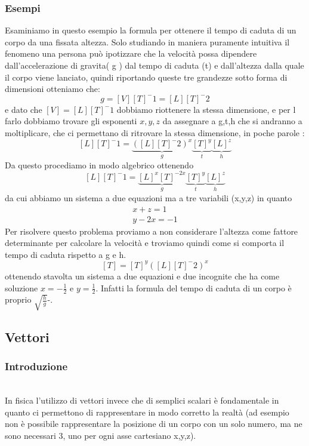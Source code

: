 \documentclass[fontsize = 20px, paper = a4]{article}
\begin{document}
\subsubsection{Esempi}
Esaminiamo in questo esempio la formula per ottenere il tempo di caduta di un corpo da una fissata altezza.
Solo studiando in maniera puramente intuitiva il fenomeno una persona può ipotizzare che la velocità possa dipendere dall'accelerazione di gravita( g ) dal tempo di caduta (t) e dall'altezza dalla quale il corpo viene lanciato, quindi riportando queste tre grandezze sotto forma di dimensioni otteniamo che:
$$g = [V][T]^-1 = [L][T]^-2$$
e dato che $[V] = [L][T]^-1$ dobbiamo riottenere la stessa dimensione, e per l farlo dobbiamo trovare gli esponenti $x,y,z$ da assegnare a g,t,h che si andranno a moltiplicare, che ci permettano di ritrovare la stessa dimensione, in poche parole :
$$[L][T]^-1 = \underbrace{([L][T]^-2)^x}_g \underbrace{[T]^y}_t \underbrace{[L]^z}_h$$
Da questo procediamo in modo algebrico ottenendo
$$[L][T]^-1 = \underbrace{[L]^x[T]^{-2x}}_g \underbrace{[T]^y}_t \underbrace{[L]^z}_h$$
da cui abbiamo un sistema a due equazioni ma a tre variabili (x,y,z) in quanto
$$
\begin{array}{lr}
   x+z = 1 \\
   y - 2x = -1
  \end{array}
$$
Per risolvere questo problema proviamo a non considerare l'altezza come fattore determinante per calcolare la velocità e troviamo quindi come si comporta il tempo di caduta rispetto a g e h.
$$[T] = [T]^y ([L][T]^-2)^x$$
ottenendo stavolta un sistema a due equazioni e due incognite che ha come soluzione $x = -\frac{1}{2}$ e $y = \frac{1}{2}$. Infatti la formula del tempo di caduta di un corpo è proprio $\sqrt{\frac{h}{g}}$-. \\
\subsection{Vettori}
\hspace*{0.1cm}
\subsubsection{Introduzione}
\hspace*{0.1cm} \\ 
In fisica l'utilizzo di vettori invece che di semplici scalari è fondamentale in quanto ci permettono di rappresentare in modo corretto la realtà (ad esempio non è possibile rappresentare la posizione di un corpo con un solo numero, ma ne sono necessari 3, uno per ogni asse cartesiano x,y,z).
\end{document}
